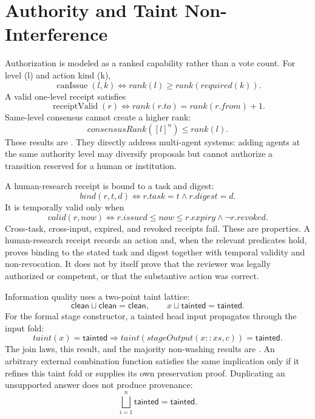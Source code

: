 \section{Authority and Taint Non-Interference}
\label{sec:noninterference}

Authorization is modeled as a ranked capability rather than a vote count. For level (l) and action kind (k),
\begin{equation}
\operatorname{canIssue}(l,k)\iff
rank(l)\ge rank(required(k)).
\label{eq:can-issue}
\end{equation}
A valid one-level receipt satisfies
\begin{equation}
\operatorname{receiptValid}(r)\iff
rank(r.to)=rank(r.from)+1.
\label{eq:receipt-valid}
\end{equation}
Same-level consensus cannot create a higher rank:
\begin{equation}
consensusRank([l]^n)\le rank(l).
\label{eq:consensus-rank}
\end{equation}
These results are \formalized{}. They directly address multi-agent systems: adding agents at the same authority level may diversify proposals but cannot authorize a transition reserved for a human or institution.

A human-research receipt is bound to a task and digest:
\begin{equation}
bind(r,t,d)\iff r.task=t\land r.digest=d.
\label{eq:receipt-bind}
\end{equation}
It is temporally valid only when
\begin{equation}
valid(r,now)\iff r.issued\le now\le r.expiry\land\neg r.revoked.
\label{eq:receipt-time}
\end{equation}
Cross-task, cross-input, expired, and revoked receipts fail. These are \formalized{} properties. A human-research receipt records an action and, when the relevant predicates hold, proves binding to the stated task and digest together with temporal validity and non-revocation. It does not by itself prove that the reviewer was legally authorized or competent, or that the substantive action was correct.

Information quality uses a two-point taint lattice:
\begin{equation}
\mathsf{clean}\sqcup\mathsf{clean}=\mathsf{clean},
\qquad x\sqcup\mathsf{tainted}=\mathsf{tainted}.
\label{eq:taint-join}
\end{equation}
For the formal stage constructor, a tainted head input propagates through the input fold:
\begin{equation}
taint(x)=\mathsf{tainted}
\Longrightarrow
taint(stageOutput(x::xs,c))=\mathsf{tainted}.
\label{eq:taint-propagation}
\end{equation}
The join laws, this  result, and the majority non-washing results are \formalized{}. An arbitrary external combination function satisfies the same implication only if it refines this taint fold or supplies its own preservation proof. Duplicating an unsupported answer does not produce provenance:
\begin{equation}
\bigsqcup_{i=1}^{n}\mathsf{tainted}=\mathsf{tainted}.
\label{eq:no-taint-washing}
\end{equation}

